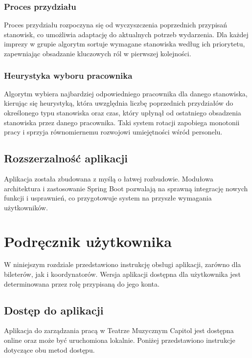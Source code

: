 \documentclass[shortabstract]{iithesis}
\begin{document}
\subsection{Proces przydziału}

Proces przydziału rozpoczyna się od wyczyszczenia poprzednich przypisań stanowisk, co umożliwia adaptację do aktualnych potrzeb wydarzenia. Dla każdej imprezy w grupie algorytm sortuje wymagane stanowiska według ich priorytetu, zapewniając obsadzanie kluczowych ról w pierwszej kolejności.

\subsection{Heurystyka wyboru pracownika}

Algorytm wybiera najbardziej odpowiedniego pracownika dla danego stanowiska, kierując się
heurystyką, która uwzględnia liczbę poprzednich przydziałów do określonego typu stanowiska
oraz czas, który upłynął od ostatniego obsadzenia stanowiska przez danego pracownika. Taki system rotacji zapobiega monotonii pracy i sprzyja równomiernemu rozwojowi umiejętności wśród personelu.


\section{Rozszerzalność aplikacji}

Aplikacja została zbudowana z myślą o łatwej rozbudowie. Modułowa architektura i zastosowanie Spring Boot pozwalają na sprawną integrację nowych funkcji i usprawnień, co przygotowuje system na przyszłe wymagania użytkowników.

\chapter{Podręcznik użytkownika}

W niniejszym rozdziale przedstawiono instrukcję obsługi aplikacji, zarówno dla bileterów, jak i koordynatorów. Wersja aplikacji dostępna dla użytkownika jest determinowana przez rolę przypisaną do jego konta.

\section{Dostęp do aplikacji}

Aplikacja do zarządzania pracą w Teatrze Muzycznym Capitol jest dostępna online oraz może być uruchomiona lokalnie. Poniżej przedstawiono instrukcje dotyczące obu metod dostępu.
\end{document}
